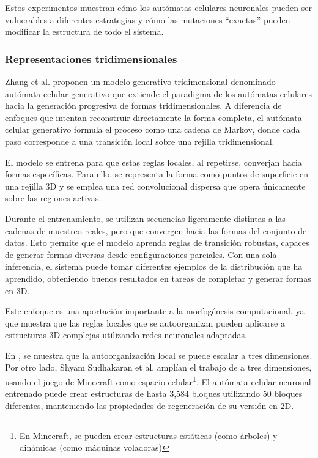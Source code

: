 Estos experimentos muestran cómo los autómatas celulares neuronales pueden ser vulnerables a diferentes estrategias y cómo las mutaciones ``exactas'' pueden modificar la estructura de todo el sistema.

\subsubsection{Representaciones tridimensionales}

Zhang et al. \cite{zhang2021_gca} proponen un modelo generativo tridimensional denominado autómata celular generativo que extiende el paradigma de los autómatas celulares hacia la generación progresiva de formas tridimensionales. A diferencia de enfoques que intentan reconstruir directamente la forma completa, el autómata celular generativo formula el proceso como una cadena de Markov, donde cada paso corresponde a una transición local sobre una rejilla tridimensional. 

El modelo se entrena para que estas reglas locales, al repetirse, converjan hacia formas específicas. Para ello, se representa la forma como puntos de superficie en una rejilla 3D y se emplea una red convolucional dispersa que opera únicamente sobre las regiones activas.

Durante el entrenamiento, se utilizan secuencias ligeramente distintas a las cadenas de muestreo reales, pero que convergen hacia las formas del conjunto de datos. Esto permite que el modelo aprenda reglas de transición robustas, capaces de generar formas diversas desde configuraciones parciales. Con una sola inferencia, el sistema puede tomar diferentes ejemplos de la distribución que ha aprendido, obteniendo buenos resultados en tareas de completar y generar formas en 3D.

Este enfoque es una aportación importante a la morfogénesis computacional, ya que muestra que las reglas locales que se autoorganizan pueden aplicarse a estructuras 3D complejas utilizando redes neuronales adaptadas.

En \cite{zhang2021_gca}, se muestra que la autoorganización local se puede escalar a tres dimensiones. Por otro lado, Shyam Sudhakaran et al. \cite{sudhakaran2021_nca_3d} amplían el trabajo de \cite{mordvintsev2020_nca} a tres dimensiones, usando el juego de Minecraft como espacio celular\footnote{En Minecraft, se pueden crear estructuras estáticas (como árboles) y dinámicas (como máquinas voladoras)}. El autómata celular neuronal entrenado puede crear estructuras de hasta 3,584 bloques utilizando 50 bloques diferentes, manteniendo las propiedades de regeneración de su versión en 2D.

